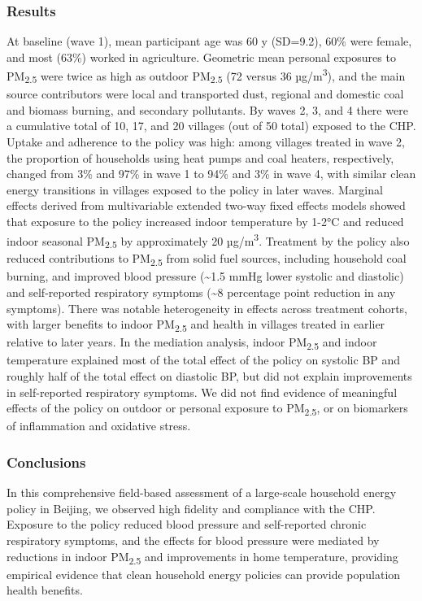 \documentclass[
  letterpaper,
  DIV=11,
  numbers=noendperiod]{scrartcl}
\begin{document}
\subsubsection*{Results}\label{results}

At baseline (wave 1), mean participant age was 60 y (SD=9.2), 60\% were
female, and most (63\%) worked in agriculture. Geometric mean personal
exposures to PM\textsubscript{2.5} were twice as high as outdoor
PM\textsubscript{2.5} (72 versus 36 µg/m\textsuperscript{3}), and the
main source contributors were local and transported dust, regional and
domestic coal and biomass burning, and secondary pollutants. By waves 2,
3, and 4 there were a cumulative total of 10, 17, and 20 villages (out
of 50 total) exposed to the CHP. Uptake and adherence to the policy was
high: among villages treated in wave 2, the proportion of households
using heat pumps and coal heaters, respectively, changed from 3\% and
97\% in wave 1 to 94\% and 3\% in wave 4, with similar clean energy
transitions in villages exposed to the policy in later waves. Marginal
effects derived from multivariable extended two-way fixed effects models
showed that exposure to the policy increased indoor temperature by 1-2°C
and reduced indoor seasonal PM\textsubscript{2.5} by approximately 20
µg/m\textsuperscript{3}. Treatment by the policy also reduced
contributions to PM\textsubscript{2.5} from solid fuel sources,
including household coal burning, and improved blood pressure
(\textasciitilde1.5 mmHg lower systolic and diastolic) and self-reported
respiratory symptoms (\textasciitilde8 percentage point reduction in any
symptoms). There was notable heterogeneity in effects across treatment
cohorts, with larger benefits to indoor PM\textsubscript{2.5} and health
in villages treated in earlier relative to later years. In the mediation
analysis, indoor PM\textsubscript{2.5} and indoor temperature explained
most of the total effect of the policy on systolic BP and roughly half
of the total effect on diastolic BP, but did not explain improvements in
self-reported respiratory symptoms. We did not find evidence of
meaningful effects of the policy on outdoor or personal exposure to
PM\textsubscript{2.5}, or on biomarkers of inflammation and oxidative
stress.

\subsubsection*{Conclusions}\label{conclusions}

In this comprehensive field-based assessment of a large-scale household
energy policy in Beijing, we observed high fidelity and compliance with
the CHP. Exposure to the policy reduced blood pressure and self-reported
chronic respiratory symptoms, and the effects for blood pressure were
mediated by reductions in indoor PM\textsubscript{2.5} and improvements
in home temperature, providing empirical evidence that clean household
energy policies can provide population health benefits.
\end{document}

